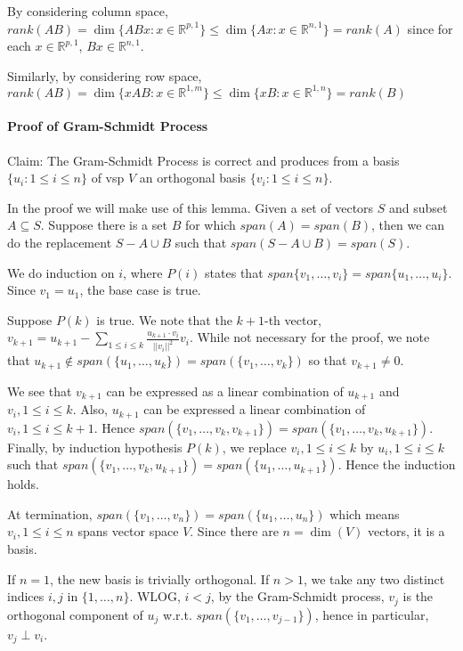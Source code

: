 \documentclass{article}
\begin{document}
By considering column space, $rank(AB) = \dim \{ABx : x\in \mathbb{R}^{p,1}\}\leq \dim \{Ax : x\in \mathbb{R}^{n,1}\} = rank(A)$ since for each $x\in \mathbb{R}^{p,1}$, $Bx\in \mathbb{R}^{n,1}$.

Similarly, by considering row space, $rank(AB) = \dim \{xAB : x\in \mathbb{R}^{1,m}\}\leq \dim \{xB : x\in \mathbb{R}^{1,n}\} = rank(B)$

\paragraph{Proof of Gram-Schmidt Process} 
Claim: The Gram-Schmidt Process is correct and produces from a basis $\{u_i : 1\leq i\leq n\}$ of vsp $V$ an orthogonal basis $\{v_i : 1\leq i\leq n\}$.

In the proof we will make use of this lemma. Given a set of vectors $S$ and subset $A\subseteq S$. Suppose there is a set $B$ for which $span(A) = span(B)$, then we can do the replacement $S-A\cup B$ such that $span(S-A\cup B) = span(S)$.

We do induction on $i$, where $P(i)$ states that $span \{v_1,\dots,v_i\} = span \{u_1,\dots,u_i\}$. Since $v_1 = u_1$, the base case is true.

Suppose $P(k)$ is true. We note that the $k+1$-th vector, $v_{k+1} = u_{k+1} - \sum_{1\leq i\leq k}\frac{u_{k+1}\cdot v_i}{||v_i||^2}v_i$. While not necessary for the proof, we note that $u_{k+1}\notin span(\{u_1,\dots,u_k\}) = span(\{v_1,\dots,v_k\})$ so that $v_{k+1}\neq 0$.

We see that $v_{k+1}$ can be expressed as a linear combination of $u_{k+1}$ and $v_i, 1\leq i\leq k$. Also, $u_{k+1}$ can be expressed a linear combination of $v_i, 1\leq i\leq k+1$. Hence $span(\{v_1,\dots,v_k,v_{k+1}\}) = span(\{v_1,\dots,v_k,u_{k+1}\})$. Finally, by induction hypothesis $P(k)$, we replace $v_i, 1\leq i\leq k$ by $u_i, 1\leq i\leq k$ such that $span(\{v_1,\dots,v_k,u_{k+1}\})=span(\{u_1,\dots,u_{k+1}\})$. Hence the induction holds.

At termination, $span(\{v_1,\dots,v_n\}) = span(\{u_1,\dots,u_n\})$ which means $v_i, 1\leq i\leq n$ spans vector space $V$. Since there are $n=\dim(V)$ vectors, it is a basis.

If $n=1$, the new basis is trivially orthogonal. If $n>1$, we take any two distinct indices $i, j$ in $\{1,\dots,n\}$. WLOG, $i < j$, by the Gram-Schmidt process, $v_j$ is the orthogonal component of $u_j$ w.r.t. $span(\{v_1,\dots, v_{j-1}\})$, hence in particular, $v_j\perp v_i$.
\end{document}
